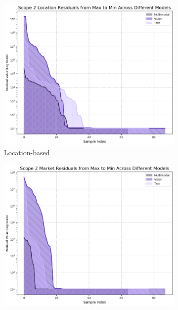 \documentclass[english, 12pt, a4paper, elec, utf8, a-2b, online]{aaltothesis}
\begin{document}
\begin{figure}[H]
    \centering
    \begin{subfigure}[b]{0.32\textwidth}
        \includegraphics[width=\textwidth]{images/scope2_location_residuals.png}
        \caption{Location-based}
        \label{fig:scope_2_location_residual}
    \end{subfigure}
    \hfill
    \begin{subfigure}[b]{0.32\textwidth}
        \includegraphics[width=\textwidth]{images/scope2_market_residuals.png}

\end{subfigure}
\end{figure}
\end{document}
